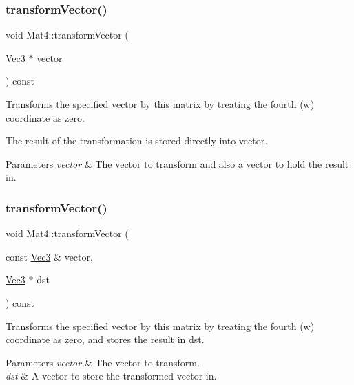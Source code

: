 \subsubsection{\texorpdfstring{transform\+Vector()}{transformVector()}\hspace{0.1cm}{\footnotesize\ttfamily [2/10]}}
{\footnotesize\ttfamily void Mat4\+::transform\+Vector (\begin{DoxyParamCaption}\item[{\hyperlink{classVec3}{Vec3} $\ast$}]{vector }\end{DoxyParamCaption}) const}

Transforms the specified vector by this matrix by treating the fourth (w) coordinate as zero.

The result of the transformation is stored directly into vector.


\begin{DoxyParams}{Parameters}
{\em vector} & The vector to transform and also a vector to hold the result in. \\
\hline
\end{DoxyParams}
\mbox{\label{classMat4_ae115470538b721dfd6dda37b4d487805}} 
\subsubsection{\texorpdfstring{transform\+Vector()}{transformVector()}\hspace{0.1cm}{\footnotesize\ttfamily [3/10]}}
{\footnotesize\ttfamily void Mat4\+::transform\+Vector (\begin{DoxyParamCaption}\item[{const \hyperlink{classVec3}{Vec3} \&}]{vector,  }\item[{\hyperlink{classVec3}{Vec3} $\ast$}]{dst }\end{DoxyParamCaption}) const}

Transforms the specified vector by this matrix by treating the fourth (w) coordinate as zero, and stores the result in dst.


\begin{DoxyParams}{Parameters}
{\em vector} & The vector to transform. \\
\hline
{\em dst} & A vector to store the transformed vector in. \\
\hline
\end{DoxyParams}
\mbox{\label{classMat4_ae115470538b721dfd6dda37b4d487805}} 

